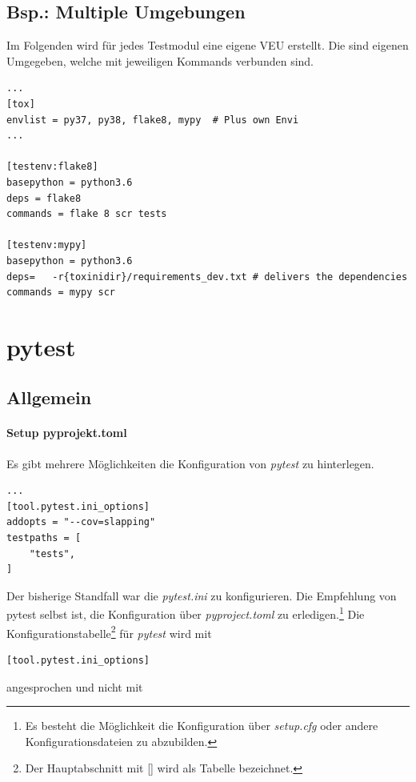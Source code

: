 \subsection{Bsp.: Multiple Umgebungen}
Im Folgenden wird für jedes Testmodul eine eigene \gls{VEU} erstellt.
Die sind eigenen Umgegeben, welche mit jeweiligen Kommands verbunden sind. 

\begin{lstlisting}[style=Config, caption={Own Env}, captionpos=b]
...
[tox]
envlist = py37, py38, flake8, mypy	# Plus own Envi
...

[testenv:flake8]
basepython = python3.6
deps = flake8
commands = flake 8 scr tests

[testenv:mypy]
basepython = python3.6
deps=	-r{toxinidir}/requirements_dev.txt # delivers the dependencies
commands = mypy scr
\end{lstlisting}

\section{pytest}
\subsection{Allgemein}
\paragraph{Setup pyprojekt.toml} \label{par:Setup pyprojekt.toml} 
Es gibt mehrere Möglichkeiten die Konfiguration von \textit{pytest} zu hinterlegen. 

\begin{lstlisting}[style=Config, caption={Beispiel pyproject.toml; Slapping pytest config}, captionpos=b]
...
[tool.pytest.ini_options]
addopts = "--cov=slapping"
testpaths = [
	"tests",
]
\end{lstlisting}


Der bisherige Standfall war die \textit{pytest.ini} zu konfigurieren. Die Empfehlung von pytest selbst ist, die Konfiguration über \textit{pyproject.toml} zu erledigen.\footnote{
	Es besteht die Möglichkeit die Konfiguration über \textit{setup.cfg} oder andere Konfigurationsdateien zu abzubilden.
}
Die Konfigurationstabelle\footnote{
	Der Hauptabschnitt mit [] wird als Tabelle bezeichnet.
}
für \textit{pytest} wird mit 

\begin{lstlisting}[style=Config, caption={zu verwenden}, captionpos=b]
[tool.pytest.ini_options]
\end{lstlisting}
angesprochen und nicht mit 

